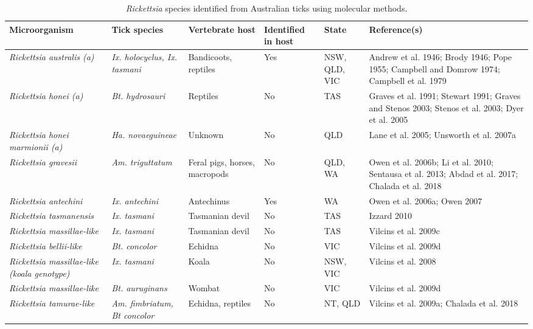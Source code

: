 \documentclass[a4paper, nobind]{templates/ociamthesis}
\begin{document}
\begin{table}

\caption[\textit{Rickettsia} species identified from Australian ticks.]{\label{tab:T1rickettsia}\textit{Rickettsia} species identified from Australian ticks using molecular methods.}
\centering
\fontsize{8}{10}\selectfont
\begin{tabular}[t]{>{\raggedright\arraybackslash}p{10em}>{\raggedright\arraybackslash}p{10em}>{\raggedright\arraybackslash}p{8em}>{\raggedright\arraybackslash}p{6em}>{\raggedright\arraybackslash}p{6em}>{\raggedright\arraybackslash}p{6em}}
\toprule
Microorganism & Tick species & Vertebrate host & Identified in host & State & Reference(s)\\
\midrule
\em{Rickettsia australis (a)} & \em{Ix. holocyclus, Ix. tasmani} & Bandicoots, reptiles & Yes & NSW, QLD, VIC & Andrew et al. 1946; Brody 1946; Pope 1955; Campbell and Domrow 1974; Campbell et al. 1979\\
\em{Rickettsia honei (a)} & \em{Bt. hydrosauri} & Reptiles & No & TAS & Graves et al. 1991; Stewart 1991; Graves and Stenos 2003;  Stenos et al. 2003; Dyer et al. 2005\\
\em{Rickettsia honei marmionii (a)} & \em{Ha. novaeguineae} & Unknown & No & QLD & Lane et al. 2005; Unsworth et al. 2007a\\
\em{Rickettsia gravesii} & \em{Am. triguttatum} & Feral pigs, horses, macropods & No & QLD, WA & Owen et al. 2006b; Li et al. 2010; Sentausa et al. 2013; Abdad et al. 2017; Chalada et al. 2018\\
\em{Rickettsia antechini} & \em{Ix. antechini} & Antechinus & Yes & WA & Owen et al. 2006a; Owen 2007\\
\em{Rickettsia tasmanensis} & \em{Ix. tasmani} & Tasmanian devil & No & TAS & Izzard 2010\\
\em{Rickettsia massillae-like} & \em{Ix. tasmani} & Tasmanian devil & No & TAS & Vilcins et al. 2009c\\
\em{Rickettsia bellii-like} & \em{Bt. concolor} & Echidna & No & VIC & Vilcins et al. 2009d\\
\em{Rickettsia massillae-like (koala genotype)} & \em{Ix. tasmani} & Koala & No & NSW, VIC & Vilcins et al. 2008\\
\em{Rickettsia massillae-like} & \em{Bt. auruginans} & Wombat & No & VIC & Vilcins et al. 2009d\\
\em{Rickettsia tamurae-like} & \em{Am. fimbriatum, Bt concolor} & Echidna, reptiles & No & NT, QLD & Vilcins et al. 2009a; Chalada et al. 2018\\

\end{tabular}
\end{table}
\end{document}
